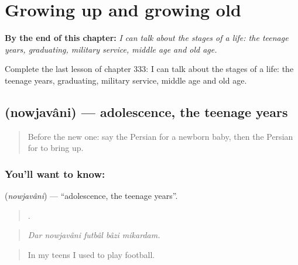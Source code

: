 
\chapter{Growing up and growing old}
\label{ch:fa-growing-up-and-growing-old}

\begin{chapteropening}
\textbf{By the end of this chapter:} \emph{I can talk about the stages of a life: the teenage years, graduating, military service, middle age and old age.}

Complete the last lesson of chapter 333: I can talk about the stages of a life: the teenage years, graduating, military service, middle age and old age.
\end{chapteropening}

\section[\texorpdfstring{\fa{نوجوانی} (nowjavâni)}{نوجوانی (nowjavâni)}]{ (nowjavâni) — adolescence, the teenage years}

\label{lesson:FA-C333-nowjavani}



\begin{quote}
Before the new one: say the Persian for a newborn baby, then the Persian for to bring up.
\end{quote}

\subsection*{You'll want to know: }
\textbf{} (\emph{nowjavâni}) — \textquotedblleft{}adolescence, the teenage years\textquotedblright{}.

\begin{quote}
    .
\end{quote}

\begin{quote}
\emph{Dar nowjavâni futbâl bâzi mikardam.}
\end{quote}

\begin{quote}
In my teens I used to play football.
\end{quote}

